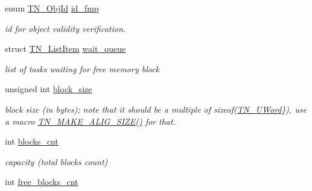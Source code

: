 \begin{DoxyCompactItemize}
\item 
enum \hyperlink{tn__common_8h_ae779dd1f6735f6e139fb70acd004d976}{T\+N\+\_\+\+Obj\+Id} \hyperlink{structTN__FMem_aee1235a605f90d80ec16547ea647eaff}{id\+\_\+fmp}
\begin{DoxyCompactList}\small\item\em id for object validity verification. \end{DoxyCompactList}\item 
\hypertarget{structTN__FMem_a63b47b05e191f4339509eef97027ca1c}{struct \hyperlink{structTN__ListItem}{T\+N\+\_\+\+List\+Item} \hyperlink{structTN__FMem_a63b47b05e191f4339509eef97027ca1c}{wait\+\_\+queue}}\label{structTN__FMem_a63b47b05e191f4339509eef97027ca1c}

\begin{DoxyCompactList}\small\item\em list of tasks waiting for free memory block \end{DoxyCompactList}\item 
unsigned int \hyperlink{structTN__FMem_a101e3e0eeb2774309a55ed1d6cad8e3f}{block\+\_\+size}
\begin{DoxyCompactList}\small\item\em block size (in bytes); note that it should be a multiple of {\ttfamily sizeof(\hyperlink{tn__arch__example_8h_ab80cba0fe9ffcd9011d53dfeb9e39bf4}{T\+N\+\_\+\+U\+Word}\})}, use a macro {\ttfamily \hyperlink{tn__common_8h_a3f48380e8a624edc643319a81192d88e}{T\+N\+\_\+\+M\+A\+K\+E\+\_\+\+A\+L\+I\+G\+\_\+\+S\+I\+Z\+E()}} for that. \end{DoxyCompactList}\item 
\hypertarget{structTN__FMem_a8c8bb7a3ac8228a865bbbea1edde9ea0}{int \hyperlink{structTN__FMem_a8c8bb7a3ac8228a865bbbea1edde9ea0}{blocks\+\_\+cnt}}\label{structTN__FMem_a8c8bb7a3ac8228a865bbbea1edde9ea0}

\begin{DoxyCompactList}\small\item\em capacity (total blocks count) \end{DoxyCompactList}\item 
\hypertarget{structTN__FMem_abf2618d6322b1339d7b3d60c6e080cb1}{int \hyperlink{structTN__FMem_abf2618d6322b1339d7b3d60c6e080cb1}{free\+\_\+blocks\+\_\+cnt}}\label{structTN__FMem_abf2618d6322b1339d7b3d60c6e080cb1}


\end{DoxyCompactItemize}
